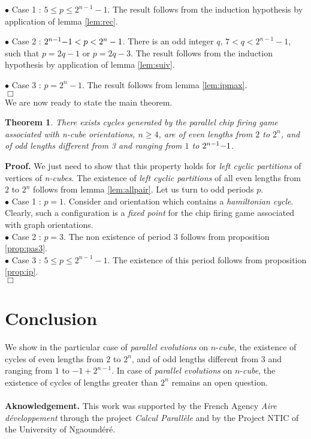 \documentclass{article}
\newtheorem{theorem}{Theorem}
\begin{document}
$\bullet$ Case 1 : $5\leq p\leq 2^{n-1}-1$. The result follows from the 
induction hypothesis by application of lemma \ref{lem:rec}.

$\bullet$ Case 2 : $2^{n-1}{\rm -}1<p<2^n-1$. There is an odd integer $q$, 
$7<q< 2^{n-1}-1$, such that $p=2q-1$ or  
$p=2q-3$. The result follows from the induction hypothesis by application of
lemma \ref{lem:suiv}.

$\bullet$ Case 3 : $p=2^n-1$. The result follows from lemma \ref{lem:ipmax}.\\
$\Box$
\\

We are now ready to state the main theorem.

\begin{theorem}  \label{th:main}
There exists cycles generated by the parallel chip firing game associated with n-cube
orientations, $n\geq 4$, are of even lengths from $2$ to $2^n$, and of odd
lengths different from 3 and ranging from $1$ to $2^{n-1}{\rm -}1$.
\end{theorem}
{\bf Proof.} We just need to show that this property holds for {\em left
  cyclic partitions} of vertices of {\em n-cubes}. The existence of {\em left cyclic partitions} of all even lengths
 from $2$ to $2^n$ follows from lemma \ref{lem:allpair}. Let us turn to odd periods $p$. \\
$\bullet$ Case 1 : $p=1$. Consider and orientation which contains a {\em
  hamiltonian cycle}. Clearly, such a configuration is a {\em fixed point} for
  the chip firing game associated with graph orientations. \\
$\bullet$ Case 2 : $p=3$. The non existence of period $3$ follows from proposition \ref{prop:pas3}. \\
$\bullet$ Case 3 : $5\leq p\leq 2^{n-1}-1$. The existence of this period
follows from proposition \ref{prop:ip}. \\
$\Box$

\section{Conclusion}
 We show in the particular case of {\em parallel evolutions} on $n$-{\em cube}, 
 the existence of cycles of even lengths from $2$ to $2^n$, and of odd lengths different
 from $3$ and ranging from $1$ to $-1+2^{n-1}$. In case of {\em parallel evolutions} on 
 $n$-{\em cube}, the existence of cycles of lengths greater than $2^n$ remains an open question. \\
\\
{\bf Aknowledgement.} This work was supported by the French Agency
 {\em Aire d\'eveloppement} through the project {\em Calcul Parall\`ele} and
 by the Project NTIC of the University of Ngaound\'er\'e.
\end{document}
